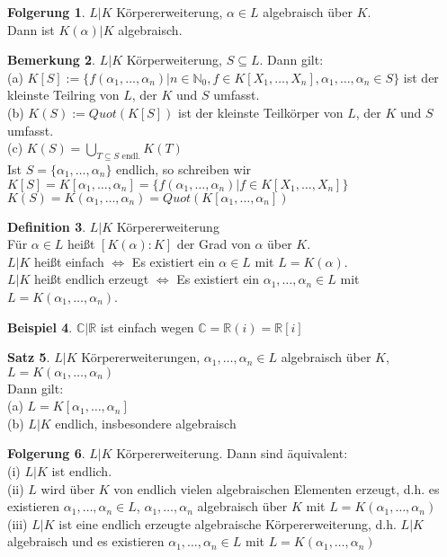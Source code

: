 \documentclass[10pt,a4paper,numbers=endperiod]{scrreprt}
\theoremstyle{definition}
\newtheorem{satz}{Satz}[section]
\newtheorem{defi}[satz]{Definition}
\newtheorem{bem}[satz]{Bemerkung}
\newtheorem{bsp}[satz]{Beispiel}
\newtheorem{folg}[satz]{Folgerung}
\def\CC{{\mathbb C}}
\def\RR{{\mathbb R}}
\def\NN{{\mathbb N}}
\begin{document}
\begin{folg}
	$L|K$ Körpererweiterung, $\alpha \in L$ algebraisch über $K$.\\
	Dann ist $K(\alpha)|K$ algebraisch.
\end{folg}

\begin{bem}
	$L|K$ Körperweiterung, $S \subseteq L$. Dann gilt:\\
	(a) $K[S] := \{f(\alpha_1, \ldots, \alpha_n)| n \in \NN_0, f \in K[X_1, \ldots, X_n], \alpha_1, \ldots, \alpha_n \in S\}$ ist der kleinste Teilring von $L$, der $K$ und $S$ umfasst.\\
	(b) $K(S) := Quot(K[S])$ ist der kleinste Teilkörper von $L$, der $K$ und $S$ umfasst.\\
	(c) $K(S) = \bigcup\limits_{T \subseteq S \text{ endl.}} K(T)$\\
	Ist $S = \{\alpha_1, \ldots, \alpha_n\}$ endlich, so schreiben wir $K[S] = K[\alpha_1, \ldots, \alpha_n] = \{f(\alpha_1, \ldots, \alpha_n)| f \in K[X_1, \ldots, X_n]\}$\\
	$K(S) = K(\alpha_1, \ldots, \alpha_n) = Quot(K[\alpha_1, \ldots, \alpha_n])$
\end{bem}

\begin{defi}
	$L|K$ Körpererweiterung\\
	Für $\alpha \in L$ heißt $[K(\alpha):K]$ der Grad von $\alpha$ über $K$.\\
	$L|K$ heißt einfach $\Leftrightarrow$ Es existiert ein $\alpha \in L$ mit $L = K(\alpha)$.\\
	$L|K$ heißt endlich erzeugt $\Leftrightarrow$ Es existiert ein $\alpha_1, \ldots, \alpha_n \in L$ mit $L = K(\alpha_1, \ldots, \alpha_n)$.
\end{defi}

\begin{bsp}
	$\CC|\RR$ ist einfach wegen $\CC = \RR(i) = \RR[i]$
\end{bsp}

\begin{satz}
	$L|K$ Körpererweiterungen, $\alpha_1, \ldots, \alpha_n \in L$ algebraisch über $K$, $L = K(\alpha_1, \ldots, \alpha_n)$\\
	Dann gilt:\\
	(a) $L = K[\alpha_1, \ldots, \alpha_n]$\\
	(b) $L|K$ endlich, insbesondere algebraisch
\end{satz}

\begin{folg}
	$L|K$ Körpererweiterung. Dann sind äquivalent:\\
	(i) $L|K$ ist endlich.\\
	(ii) $L$ wird über $K$ von endlich vielen algebraischen Elementen erzeugt, d.h. es existieren $\alpha_1, \ldots, \alpha_n \in L$, $\alpha_1, \ldots, \alpha_n$ algebraisch über $K$ mit $L = K(\alpha_1, \ldots, \alpha_n)$\\
	(iii) $L|K$ ist eine endlich erzeugte algebraische Körpererweiterung, d.h. $L|K$ algebraisch und es existieren $\alpha_1, \ldots, \alpha_n \in L$ mit $L = K(\alpha_1, \ldots, \alpha_n)$
\end{folg}
\end{document}
